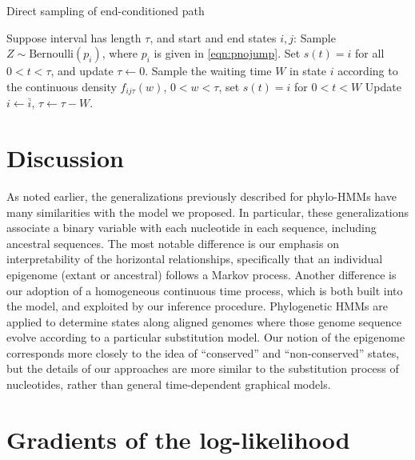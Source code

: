 \documentclass[11pt]{article}
\begin{document}
\begin{algorithm}[t]
  \begin{algorithmic}[1]
    \caption{Direct sampling of end-conditioned path}\label{alg:samplepath}
    \STATE Suppose interval has length $\tau$, and start and end states $i, j$:
    \STATE Sample $Z\sim \text{Bernoulli}(p_i)$, where
    $p_i$ is given in \eqref{eqn:pnojump}.
    \STATE Set $s(t) = i$ for all $0 < t < \tau$, and update $\tau \leftarrow 0$.
    \ENDIF
    \ENDIF
    \STATE Sample the waiting time $W$ in state $i$ according to the continuous
    density $f_{ij\tau}(w)$, $0< w < \tau$, set $s(t) = i$ for $0 < t < W$
    \STATE Update $i \leftarrow \bar{i}$, $\tau \leftarrow \tau - W$.
    \ENDIF
    \ENDWHILE
  \end{algorithmic}
\end{algorithm}


\section{Discussion}

As noted earlier, the generalizations previously described for
phylo-HMMs have many similarities with the model we proposed. In
particular, these generalizations associate a binary variable with
each nucleotide in each sequence, including ancestral sequences.  The
most notable difference is our emphasis on interpretability of the
horizontal relationships, specifically that an individual epigenome
(extant or ancestral) follows a Markov process. Another difference is
our adoption of a homogeneous continuous time process, which is both
built into the model, and exploited by our inference
procedure. Phylogenetic HMMs are applied to determine states along
aligned genomes where those genome sequence evolve according to a
particular substitution model. Our notion of the epigenome corresponds
more closely to the idea of ``conserved'' and ``non-conserved''
states, but the details of our approaches are more similar to the
substitution process of nucleotides, rather than general
time-dependent graphical models.

\clearpage




\clearpage

\section{Gradients of the log-likelihood}
\end{document}
